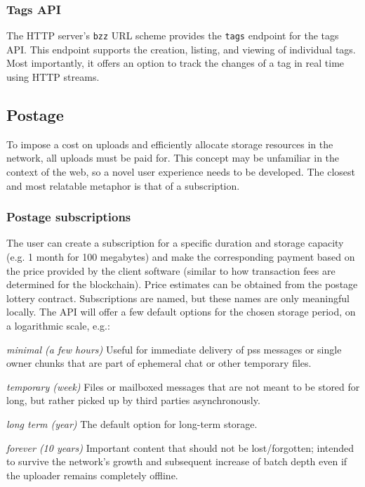 \subsubsection{Tags API} 

The HTTP server's \lstinline{bzz} URL scheme provides the \lstinline{tags} endpoint for the tags API. This endpoint supports the creation, listing, and viewing of individual tags. Most importantly, it offers an option to track the changes of a tag in real time using HTTP streams.



\subsection{Postage \statusgreen}\label{sec:postage-ux}

To impose a cost on uploads and efficiently allocate storage resources in the network, all uploads must be paid for.  This concept may be unfamiliar in the context of the web, so a novel user experience needs to be developed. The closest and most relatable metaphor is that of a subscription.

\subsubsection{Postage subscriptions}

The user can create a subscription for a specific duration and storage capacity (e.g. 1 month for 100 megabytes) and make the corresponding payment based on the price provided by the client software (similar to how transaction fees are determined for the blockchain). Price estimates can be obtained from the postage lottery contract. Subscriptions are named, but these names are only meaningful locally. The API will offer a few default options for the chosen storage period, on a logarithmic scale, e.g.: 

\begin{labelledlist}[noitemsep]
\item[\emph{minimal (a few hours)}] Useful for immediate delivery of pss messages or single owner chunks that are part of ephemeral chat or other temporary files.
\item[\emph{temporary (week)}] Files or mailboxed messages that are not meant to be stored for long, but rather picked up by third parties asynchronously.
\item[\emph{long term (year)}] The default option for long-term storage. 
\item[\emph{forever (10 years)}] Important content that should not be lost/forgotten; intended to survive the network's growth and subsequent increase of batch depth even if the uploader remains completely offline.
\end{labelledlist}

